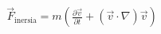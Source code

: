 \documentclass[preview]{standalone}
\begin{document}
\begin{align*}
\vec{F}_{\text{inersia}} = m \left(\frac{\partial \vec{v}}{\partial t} + (\vec{v} \cdot \nabla) \vec{v}\right)
\end{align*}
\end{document}
